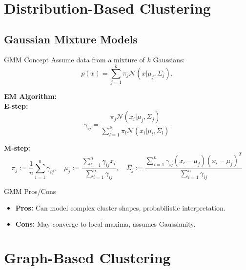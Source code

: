 \documentclass{beamer}
\begin{document}
\section{Distribution-Based Clustering}
\subsection{Gaussian Mixture Models}
\begin{frame}{GMM Concept}
    Assume data from a mixture of $k$ Gaussians:
    \[
        p(x) = \sum_{j=1}^{k} \pi_j \mathcal{N}(x|\mu_j, \Sigma_j).
    \]
    
    \textbf{EM Algorithm:} \\
    \textbf{E-step:}
    \[
        \gamma_{ij} = \frac{\pi_j \mathcal{N}(x_i|\mu_j,\Sigma_j)}{\sum_{l=1}^{k}\pi_l \mathcal{N}(x_i|\mu_l,\Sigma_l)}
    \]
    
    \textbf{M-step:}
    \[
        \pi_j := \frac{1}{n}\sum_{i=1}^{n}\gamma_{ij}, \quad
        \mu_j := \frac{\sum_{i=1}^{n}\gamma_{ij}x_i}{\sum_{i=1}^{n}\gamma_{ij}}, \quad
        \Sigma_j := \frac{\sum_{i=1}^{n}\gamma_{ij}(x_i-\mu_j)(x_i-\mu_j)^T}{\sum_{i=1}^{n}\gamma_{ij}}
    \]
\end{frame}

\begin{frame}{GMM Pros/Cons}
    \begin{itemize}
        \item \textbf{Pros:} Can model complex cluster shapes, probabilistic interpretation.
        \item \textbf{Cons:} May converge to local maxima, assumes Gaussianity.
    \end{itemize}
\end{frame}

\section{Graph-Based Clustering}
\end{document}
